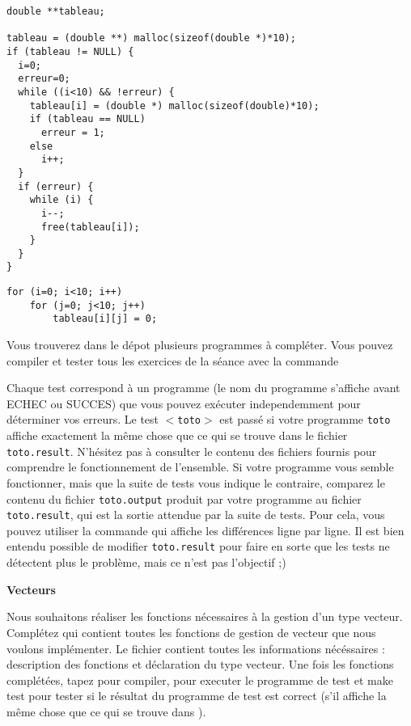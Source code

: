\documentclass[10pt]{article}\usepackage[nu]{esial}
\begin{document}
\noindent\begin{minipage}{.64\linewidth}
\begin{Verbatim}[label=Idem avec libération en cas d'erreur]
double **tableau;

tableau = (double **) malloc(sizeof(double *)*10);
if (tableau != NULL) {
  i=0;
  erreur=0;
  while ((i<10) && !erreur) {
    tableau[i] = (double *) malloc(sizeof(double)*10);
    if (tableau == NULL)
      erreur = 1;
    else
      i++;
  }
  if (erreur) {
    while (i) {
      i--;
      free(tableau[i]);
    }
  }
}
\end{Verbatim}
\end{minipage}\hfill\begin{minipage}{.35\linewidth}
  \begin{Verbatim}[label=Initialisation des éléments,numbers=right]    
for (i=0; i<10; i++)
    for (j=0; j<10; j++)
        tableau[i][j] = 0;
\end{Verbatim}
\end{minipage}

\medskip

Vous trouverez dans le dépot plusieurs programmes à compléter. Vous pouvez
compiler et tester tous les exercices de la séance avec la commande 

Chaque test correspond à un programme (le nom du programme s'affiche avant
ECHEC ou SUCCES) que vous pouvez exécuter independemment pour déterminer vos
erreurs. Le test \texttt{$<$toto$>$} est passé si votre programme \texttt{toto}
affiche exactement la même chose que ce qui se trouve dans le fichier
\texttt{toto.result}. N'hésitez pas à consulter le contenu des fichiers fournis
pour comprendre le fonctionnement de l'ensemble. Si votre programme vous semble
fonctionner, mais que la suite de tests vous indique le contraire, comparez le
contenu du fichier \texttt{toto.output} produit par votre programme au fichier
\texttt{toto.result}, qui est la sortie attendue par la suite de tests. Pour
cela, vous pouvez utiliser la commande 
qui affiche les différences ligne par ligne. Il est bien entendu possible de
modifier \texttt{toto.result} pour faire en sorte que les tests ne détectent
plus le problème, mais ce n'est pas l'objectif ;)

\begin{Exercice} \textbf{Vecteurs}

  Nous souhaitons réaliser les fonctions nécessaires à la gestion d'un type
  vecteur. Complétez  qui contient toutes les fonctions de
  gestion de vecteur que nous voulons implémenter. Le fichier 
  contient toutes les informations nécéssaires : description des fonctions et
  déclaration du type vecteur. Une fois les fonctions complétées, tapez
   pour compiler,  pour
  executer le programme de test et make test pour tester si le résultat du
  programme de test est correct (s'il affiche la même chose que ce qui se
  trouve dans ).
\end{Exercice}
\end{document}
